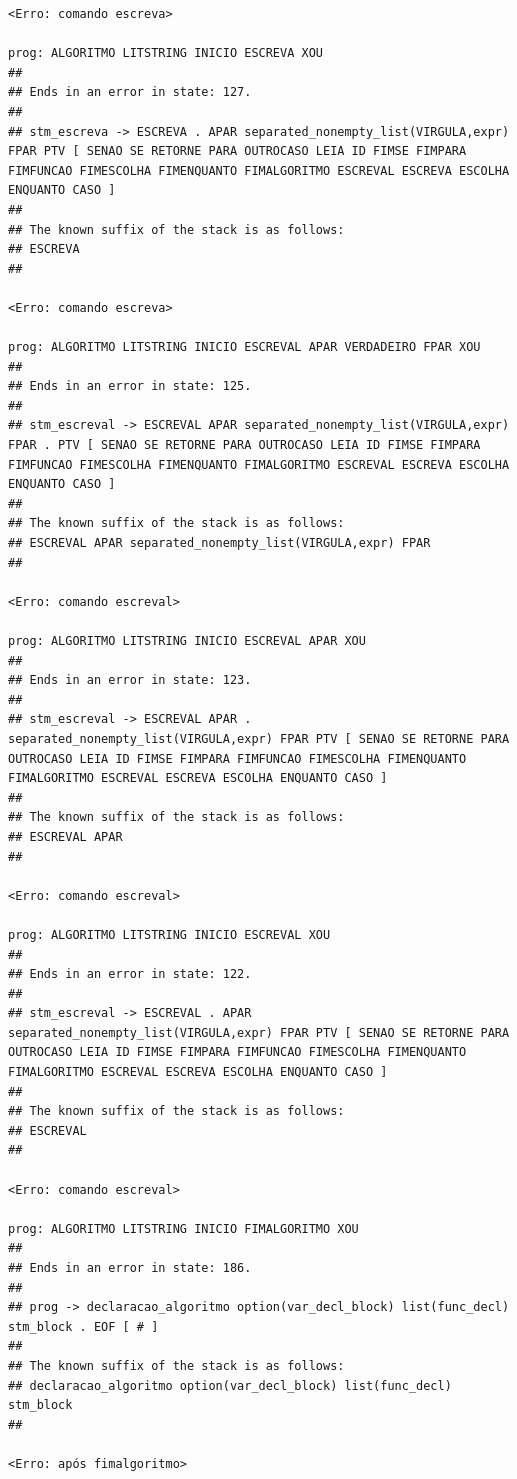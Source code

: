 \documentclass[hidelinks,12pt]{article}
\begin{document}
\begin{lstlisting}
<Erro: comando escreva>

prog: ALGORITMO LITSTRING INICIO ESCREVA XOU 
##
## Ends in an error in state: 127.
##
## stm_escreva -> ESCREVA . APAR separated_nonempty_list(VIRGULA,expr) FPAR PTV [ SENAO SE RETORNE PARA OUTROCASO LEIA ID FIMSE FIMPARA FIMFUNCAO FIMESCOLHA FIMENQUANTO FIMALGORITMO ESCREVAL ESCREVA ESCOLHA ENQUANTO CASO ]
##
## The known suffix of the stack is as follows:
## ESCREVA 
##

<Erro: comando escreva>

prog: ALGORITMO LITSTRING INICIO ESCREVAL APAR VERDADEIRO FPAR XOU 
##
## Ends in an error in state: 125.
##
## stm_escreval -> ESCREVAL APAR separated_nonempty_list(VIRGULA,expr) FPAR . PTV [ SENAO SE RETORNE PARA OUTROCASO LEIA ID FIMSE FIMPARA FIMFUNCAO FIMESCOLHA FIMENQUANTO FIMALGORITMO ESCREVAL ESCREVA ESCOLHA ENQUANTO CASO ]
##
## The known suffix of the stack is as follows:
## ESCREVAL APAR separated_nonempty_list(VIRGULA,expr) FPAR 
##

<Erro: comando escreval>

prog: ALGORITMO LITSTRING INICIO ESCREVAL APAR XOU 
##
## Ends in an error in state: 123.
##
## stm_escreval -> ESCREVAL APAR . separated_nonempty_list(VIRGULA,expr) FPAR PTV [ SENAO SE RETORNE PARA OUTROCASO LEIA ID FIMSE FIMPARA FIMFUNCAO FIMESCOLHA FIMENQUANTO FIMALGORITMO ESCREVAL ESCREVA ESCOLHA ENQUANTO CASO ]
##
## The known suffix of the stack is as follows:
## ESCREVAL APAR 
##

<Erro: comando escreval>

prog: ALGORITMO LITSTRING INICIO ESCREVAL XOU 
##
## Ends in an error in state: 122.
##
## stm_escreval -> ESCREVAL . APAR separated_nonempty_list(VIRGULA,expr) FPAR PTV [ SENAO SE RETORNE PARA OUTROCASO LEIA ID FIMSE FIMPARA FIMFUNCAO FIMESCOLHA FIMENQUANTO FIMALGORITMO ESCREVAL ESCREVA ESCOLHA ENQUANTO CASO ]
##
## The known suffix of the stack is as follows:
## ESCREVAL 
##

<Erro: comando escreval>

prog: ALGORITMO LITSTRING INICIO FIMALGORITMO XOU 
##
## Ends in an error in state: 186.
##
## prog -> declaracao_algoritmo option(var_decl_block) list(func_decl) stm_block . EOF [ # ]
##
## The known suffix of the stack is as follows:
## declaracao_algoritmo option(var_decl_block) list(func_decl) stm_block 
##

<Erro: após fimalgoritmo>


\end{lstlisting}
\end{document}
